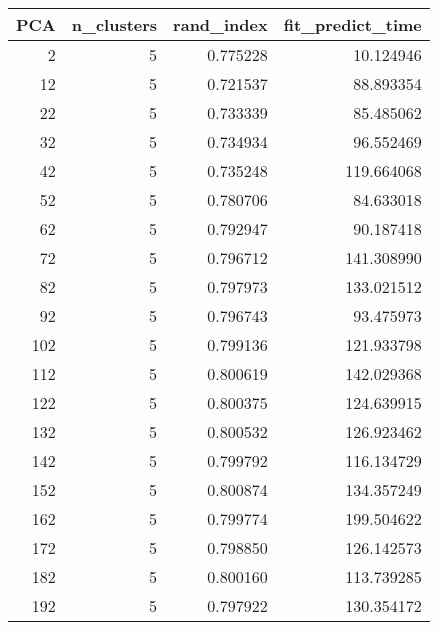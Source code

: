 \begin{tabular}{rrrr}
\toprule
PCA & n_clusters & rand_index & fit_predict_time \\
\midrule
2 & 5 & 0.775228 & 10.124946 \\
12 & 5 & 0.721537 & 88.893354 \\
22 & 5 & 0.733339 & 85.485062 \\
32 & 5 & 0.734934 & 96.552469 \\
42 & 5 & 0.735248 & 119.664068 \\
52 & 5 & 0.780706 & 84.633018 \\
62 & 5 & 0.792947 & 90.187418 \\
72 & 5 & 0.796712 & 141.308990 \\
82 & 5 & 0.797973 & 133.021512 \\
92 & 5 & 0.796743 & 93.475973 \\
102 & 5 & 0.799136 & 121.933798 \\
112 & 5 & 0.800619 & 142.029368 \\
122 & 5 & 0.800375 & 124.639915 \\
132 & 5 & 0.800532 & 126.923462 \\
142 & 5 & 0.799792 & 116.134729 \\
152 & 5 & 0.800874 & 134.357249 \\
162 & 5 & 0.799774 & 199.504622 \\
172 & 5 & 0.798850 & 126.142573 \\
182 & 5 & 0.800160 & 113.739285 \\
192 & 5 & 0.797922 & 130.354172 \\
\bottomrule
\end{tabular}
